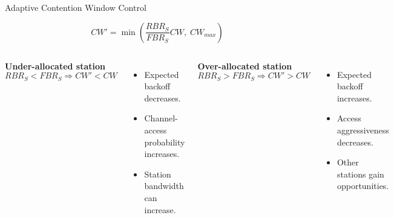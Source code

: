 \begin{frame}{Adaptive Contention Window Control}

\[
CW' = \min\left(\frac{RBR_S}{FBR_S}CW,\; CW_{max}\right)
\]

\vspace{0.35cm}

\begin{columns}[T,onlytextwidth]
\textbf{Under-allocated station}
\[
RBR_S < FBR_S \Rightarrow CW' < CW
\]
\begin{itemize}
    \item Expected backoff decreases.
    \item Channel-access probability increases.
    \item Station bandwidth can increase.
\end{itemize}

\textbf{Over-allocated station}
\[
RBR_S > FBR_S \Rightarrow CW' > CW
\]
\begin{itemize}
    \item Expected backoff increases.
    \item Access aggressiveness decreases.
    \item Other stations gain opportunities.
\end{itemize}
\end{columns}
\end{frame}

